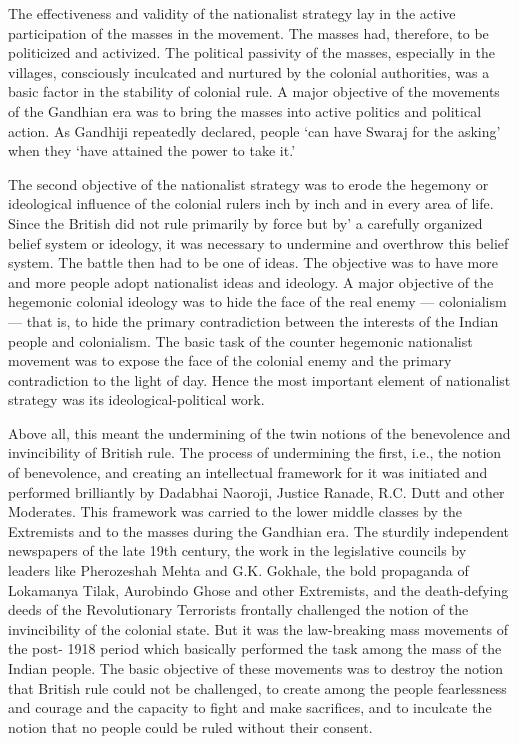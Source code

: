 \begin{multicols}{2}
The effectiveness and validity of the nationalist strategy lay in the active participation of the masses in the movement. The masses had, therefore, to be politicized and activized. The political passivity of the masses, especially in the villages, consciously inculcated and nurtured by the colonial authorities, was a basic factor in the stability of colonial rule. A major objective of the movements of the Gandhian era was to bring the masses into active politics and political action. As Gandhiji repeatedly declared, people `can have Swaraj for the asking' when they `have attained the power to take it.'

The second objective of the nationalist strategy was to erode the hegemony or ideological influence of the colonial rulers inch by inch and in every area of life. Since the British did not rule primarily by force but by' a carefully organized belief system or ideology, it was necessary to undermine and overthrow this belief system. The battle then had to be one of ideas. The objective was to have more and more people adopt nationalist ideas and ideology. A major objective of the hegemonic colonial ideology was to hide the face of the real enemy --- colonialism --- that is, to hide the primary contradiction between the interests of the Indian people and colonialism. The basic task of the counter hegemonic nationalist movement was to expose the face of the colonial enemy and the primary contradiction to the light of day. Hence the most important element of nationalist strategy was its ideological-political work.

Above all, this meant the undermining of the twin notions of the benevolence and invincibility of British rule. The process of undermining the first, i.e., the notion of benevolence, and creating an intellectual framework for it was initiated and performed brilliantly by Dadabhai Naoroji, Justice Ranade, R.C. Dutt and other Moderates. This framework was carried to the lower middle classes by the Extremists and to the masses during the Gandhian era. The sturdily independent newspapers of the late 19th century, the work in the legislative councils by leaders like Pherozeshah Mehta and G.K. Gokhale, the bold propaganda of Lokamanya Tilak, Aurobindo Ghose and other Extremists, and the death-defying deeds of the Revolutionary Terrorists frontally challenged the notion of the invincibility of the colonial state. But it was the law-breaking mass movements of the post- 1918 period which basically performed the task among the mass of the Indian people. The basic objective of these movements was to destroy the notion that British rule could not be challenged, to create among the people fearlessness and courage and the capacity to fight and make sacrifices, and to inculcate the notion that no people could be ruled without their consent.


\end{multicols}
